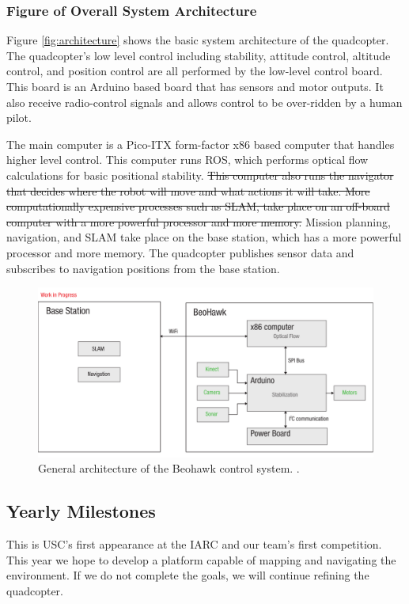 \documentclass[12pt, letterpaper]{article}
\begin{document}
\subsubsection{Figure of Overall System Architecture}

Figure \eqref{fig:architecture} shows the basic system architecture of the quadcopter. The quadcopter's low level control including stability, attitude control, altitude control, and position control are all performed by the low-level control board. This board is an Arduino based board that has sensors and motor outputs. It also receive radio-control signals and allows control to be over-ridden by a human pilot.

The main computer is a Pico-ITX form-factor x86 based computer that handles higher level control. This computer runs ROS, which performs optical flow calculations for basic positional stability. \sout{This computer also runs the navigator that decides where the robot will move and what actions it will take. More computationally expensive processes such as SLAM, take place on an off-board computer with a more powerful processor and more memory.} Mission planning, navigation, and SLAM take place on the base station, which has a more powerful processor and more memory. The quadcopter publishes sensor data and subscribes to navigation positions from the base station.

\begin{figure}[h]
\centering
\includegraphics[width=14cm]{images/beohawk-system-arch.pdf}
\caption{General architecture of the Beohawk control system. .} 
\label{fig:architecture}
\end{figure}

\subsection{Yearly Milestones}
This is USC's first appearance at the IARC and our team's first competition. This year we hope to develop a platform capable of mapping and navigating the environment.  If we do not complete the goals, we will continue refining the quadcopter. 
\end{document}
